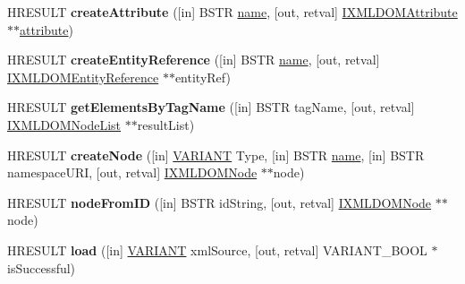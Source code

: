 \begin{DoxyCompactItemize}
\item 
\mbox{\label{interface_i_x_m_l_d_o_m_document_a7b2993c59dba1114d7ff927a09ee27a7}} 
H\+R\+E\+S\+U\+LT {\bfseries create\+Attribute} (\mbox{[}in\mbox{]} B\+S\+TR \hyperlink{structname}{name}, \mbox{[}out, retval\mbox{]} \hyperlink{interface_i_x_m_l_d_o_m_attribute}{I\+X\+M\+L\+D\+O\+M\+Attribute} $\ast$$\ast$\hyperlink{structattribute}{attribute})
\item 
\mbox{\label{interface_i_x_m_l_d_o_m_document_a704fc1e144aa76f3f16cb59afc17ea54}} 
H\+R\+E\+S\+U\+LT {\bfseries create\+Entity\+Reference} (\mbox{[}in\mbox{]} B\+S\+TR \hyperlink{structname}{name}, \mbox{[}out, retval\mbox{]} \hyperlink{interface_i_x_m_l_d_o_m_entity_reference}{I\+X\+M\+L\+D\+O\+M\+Entity\+Reference} $\ast$$\ast$entity\+Ref)
\item 
\mbox{\label{interface_i_x_m_l_d_o_m_document_a03fd6a0477733d59355a72989568249a}} 
H\+R\+E\+S\+U\+LT {\bfseries get\+Elements\+By\+Tag\+Name} (\mbox{[}in\mbox{]} B\+S\+TR tag\+Name, \mbox{[}out, retval\mbox{]} \hyperlink{interface_i_x_m_l_d_o_m_node_list}{I\+X\+M\+L\+D\+O\+M\+Node\+List} $\ast$$\ast$result\+List)
\item 
\mbox{\label{interface_i_x_m_l_d_o_m_document_a7d33b9b0db4cb166e61f91015cb74fac}} 
H\+R\+E\+S\+U\+LT {\bfseries create\+Node} (\mbox{[}in\mbox{]} \hyperlink{structtag_v_a_r_i_a_n_t}{V\+A\+R\+I\+A\+NT} Type, \mbox{[}in\mbox{]} B\+S\+TR \hyperlink{structname}{name}, \mbox{[}in\mbox{]} B\+S\+TR namespace\+U\+RI, \mbox{[}out, retval\mbox{]} \hyperlink{interface_i_x_m_l_d_o_m_node}{I\+X\+M\+L\+D\+O\+M\+Node} $\ast$$\ast$node)
\item 
\mbox{\label{interface_i_x_m_l_d_o_m_document_ae6a3fb438b61ecc4f71c2040a432c515}} 
H\+R\+E\+S\+U\+LT {\bfseries node\+From\+ID} (\mbox{[}in\mbox{]} B\+S\+TR id\+String, \mbox{[}out, retval\mbox{]} \hyperlink{interface_i_x_m_l_d_o_m_node}{I\+X\+M\+L\+D\+O\+M\+Node} $\ast$$\ast$node)
\item 
\mbox{\label{interface_i_x_m_l_d_o_m_document_a19f5c6c8dc6a01b8e16f7359e5f4bf16}} 
H\+R\+E\+S\+U\+LT {\bfseries load} (\mbox{[}in\mbox{]} \hyperlink{structtag_v_a_r_i_a_n_t}{V\+A\+R\+I\+A\+NT} xml\+Source, \mbox{[}out, retval\mbox{]} V\+A\+R\+I\+A\+N\+T\+\_\+\+B\+O\+OL $\ast$is\+Successful)
$$
\end{DoxyCompactItemize}

